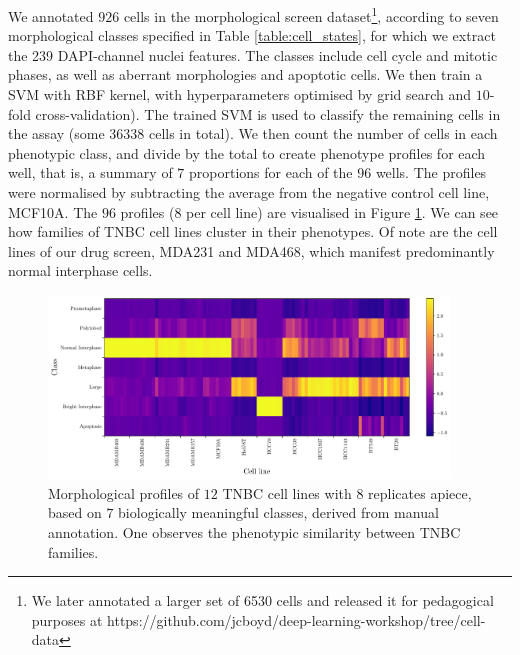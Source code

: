 We annotated $926$ cells in the morphological screen dataset\footnote{We later annotated a larger set of 6530 cells and released it for pedagogical purposes at https://github.com/jcboyd/deep-learning-workshop/tree/cell-data}, according to seven morphological classes specified in Table \ref{table:cell_states}, for which we extract the 239 DAPI-channel nuclei features. The classes include cell cycle and mitotic phases, as well as aberrant morphologies and apoptotic cells. We then train a SVM with RBF kernel, with hyperparameters optimised by grid search and $10$-fold cross-validation). The trained SVM is used to classify the remaining cells in the assay (some $36338$ cells in total). We then count the number of cells in each phenotypic class, and divide by the total to create phenotype profiles for each well, that is, a summary of $7$ proportions for each of the 96 wells. The profiles were normalised by subtracting the average from the negative control cell line, MCF10A. The $96$ profiles ($8$ per cell line) are visualised in Figure \ref{fig:morphological_profiles}. We can see how families of TNBC cell lines cluster in their phenotypes. Of note are the cell lines of our drug screen, MDA231 and MDA468, which manifest predominantly normal interphase cells. 

\begin{figure}[h]
\centering
\includegraphics[width=0.95\textwidth]{img/profile.pdf}
\caption{Morphological profiles of $12$ TNBC cell lines with $8$ replicates apiece, based on $7$ biologically meaningful classes, derived from manual annotation. One observes the phenotypic similarity between TNBC families.}
\label{fig:morphological_profiles}
\end{figure}

